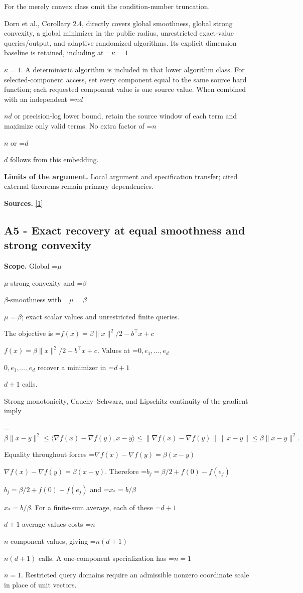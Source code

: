 \documentclass[10pt,a4paper]{article}
\newcommand{\AtlasMath}[1]{\par\begingroup\centering\setbox0=\hbox{$\displaystyle #1$}\ifdim\wd0>1.4\linewidth\typeout{ATLAS WIDE FORMULA: \the\wd0}\fi\ifdim\wd0>\linewidth\resizebox{\linewidth}{!}{\box0}\else\box0\fi\par\endgroup}
\newcommand{\AtlasInlineMath}[1]{\begingroup\setbox0=\hbox{$#1$}\ifdim\wd0>.4\linewidth\endgroup\AtlasMath{#1}\else\endgroup$#1$\fi}
\begin{document}
For the merely convex class omit the condition-number truncation.

Dorn et al., Corollary 2.4, directly covers global smoothness, global strong convexity, a global minimizer in the public radius, unrestricted exact-value queries/output, and adaptive randomized algorithms. Its explicit dimension baseline is retained, including at \AtlasInlineMath{\kappa=1}. A deterministic algorithm is included in that lower algorithm class. For selected-component access, set every component equal to the same source hard function; each requested component value is one source value. When combined with an independent \AtlasInlineMath{nd} or precision-log lower bound, retain the source window of each term and maximize only valid terms. No extra factor of \AtlasInlineMath{n} or \AtlasInlineMath{d} follows from this embedding.

\textbf{Limits of the argument.} Local argument and specification transfer; cited external theorems remain primary dependencies.

\textbf{Sources.} \href{https://arxiv.org/html/2610.00345v1}{[1]}

\subsection{A5 - Exact recovery at equal smoothness and strong convexity}
\textbf{Scope.} Global \AtlasInlineMath{\mu}-strong convexity and \AtlasInlineMath{\beta}-smoothness with \AtlasInlineMath{\mu=\beta}; exact scalar values and unrestricted finite queries.

The objective is \AtlasInlineMath{f(x)=\beta\|x\|^2/2-b^\top x+c}. Values at \AtlasInlineMath{0,e_1,\ldots,e_d} recover a minimizer in \AtlasInlineMath{d+1} calls.

Strong monotonicity, Cauchy--Schwarz, and Lipschitz continuity of the gradient imply

\AtlasMath{\beta\|x-y\|^2\le\langle\nabla f(x)-\nabla f(y),x-y\rangle\le\|\nabla f(x)-\nabla f(y)\|\,\|x-y\|\le\beta\|x-y\|^2.}

Equality throughout forces \AtlasInlineMath{\nabla f(x)-\nabla f(y)=\beta(x-y)}. Therefore \AtlasInlineMath{b_j=\beta/2+f(0)-f(e_j)} and \AtlasInlineMath{x_*=b/\beta}. For a finite-sum average, each of these \AtlasInlineMath{d+1} average values costs \AtlasInlineMath{n} component values, giving \AtlasInlineMath{n(d+1)} calls. A one-component specialization has \AtlasInlineMath{n=1}. Restricted query domains require an admissible nonzero coordinate scale in place of unit vectors.
\end{document}
